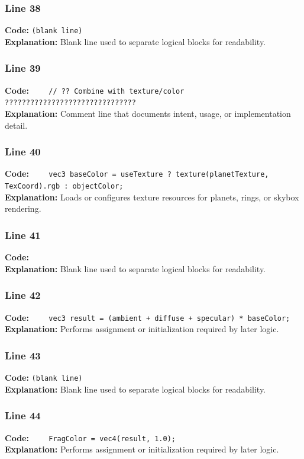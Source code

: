 \documentclass[11pt,a4paper]{article}
\begin{document}
\subsubsection*{Line 38}
\textbf{Code:} \texttt{(blank line)}\\
\textbf{Explanation:} Blank line used to separate logical blocks for readability.

\subsubsection*{Line 39}
\textbf{Code:} \verb|    // ?? Combine with texture/color ???????????????????????????????|\\
\textbf{Explanation:} Comment line that documents intent, usage, or implementation detail.

\subsubsection*{Line 40}
\textbf{Code:} \verb|    vec3 baseColor = useTexture ? texture(planetTexture, TexCoord).rgb : objectColor;|\\
\textbf{Explanation:} Loads or configures texture resources for planets, rings, or skybox rendering.

\subsubsection*{Line 41}
\textbf{Code:} \verb|    |\\
\textbf{Explanation:} Blank line used to separate logical blocks for readability.

\subsubsection*{Line 42}
\textbf{Code:} \verb|    vec3 result = (ambient + diffuse + specular) * baseColor;|\\
\textbf{Explanation:} Performs assignment or initialization required by later logic.

\subsubsection*{Line 43}
\textbf{Code:} \texttt{(blank line)}\\
\textbf{Explanation:} Blank line used to separate logical blocks for readability.

\subsubsection*{Line 44}
\textbf{Code:} \verb|    FragColor = vec4(result, 1.0);|\\
\textbf{Explanation:} Performs assignment or initialization required by later logic.
\end{document}
